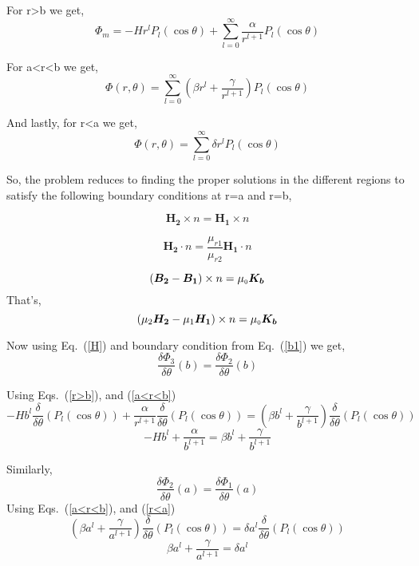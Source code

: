 For r\textgreater b we get,
\begin{equation}\label{r>b}
\Phi_m=-Hr^lP_l(\cos\theta)+\sum_{l=0}^{\infty}\frac{\alpha}{r^{l+1}}P_l(\cos\theta)
\end{equation}

For a\textless r\textless b we get,
\begin{equation}\label{a<r<b}
\Phi(r,\theta)=\sum_{l=0}^{\infty} \left(\beta r^l+\frac{\gamma}{r^{l+1}}\right)P_l(\cos\theta)
\end{equation}

And lastly, for r\textless a we get,
\begin{equation}\label{r<a}
\Phi(r,\theta)=\sum_{l=0}^{\infty} \delta r^l P_l(\cos\theta)
\end{equation}

So, the problem reduces to finding the proper solutions in the different regions to satisfy the following boundary conditions at r=a and r=b,


\begin{equation}\label{b1}   
\bm{H_2}\times n = \bm{H_1}\times n  
\end{equation}

\begin{equation}\label{b2}   
\bm{H_2}\cdot n=\frac{\mu_{r1}}{\mu_{r2}}\bm{H_1}\cdot n
\end{equation}

$$(\bm{B_2} - \bm{B_1})\times n = \mu_{\scriptscriptstyle 0} \bm{K_b}$$
That's,
\begin{equation}\label{b3}   
(\mu_2\bm{H_2} - \mu_1\bm{H_1})\times n = \mu_{\scriptscriptstyle 0} \bm{K_b}  
\end{equation}

Now using Eq.~(\ref{H}) and boundary condition from Eq.~(\ref{b1}) we get,
$$\frac{\delta \Phi_3}{\delta \theta}(b)=\frac{\delta \Phi_2}{\delta \theta}(b)$$

Using Eqs.~(\ref{r>b}), and (\ref{a<r<b})
$$-Hb^l\frac{\delta}{\delta \theta}(P_l(\cos\theta))+\frac{\alpha}{r^{l+1}}\frac{\delta}{\delta \theta}(P_l(\cos\theta))=\left(\beta b^l+\frac{\gamma}{b^{l+1}}\right)\frac{\delta}{\delta \theta}(P_l(\cos\theta))$$
\begin{equation}\label{e01}
-Hb^l+\frac{\alpha}{b^{l+1}}=\beta b^l+\frac{\gamma}{b^{l+1}}
\end{equation}

Similarly,
$$\frac{\delta \Phi_2}{\delta \theta}(a)=\frac{\delta \Phi_1}{\delta \theta}(a)$$
Using Eqs.~(\ref{a<r<b}), and (\ref{r<a})
$$\left(\beta a^l+\frac{\gamma}{a^{l+1}}\right)\frac{\delta}{\delta \theta}(P_l(\cos\theta))=\delta a^l \frac{\delta}{\delta \theta}(P_l(\cos\theta))$$
\begin{equation}\label{e02}
\beta a^l+\frac{\gamma}{a^{l+1}}=\delta a^l
\end{equation}

